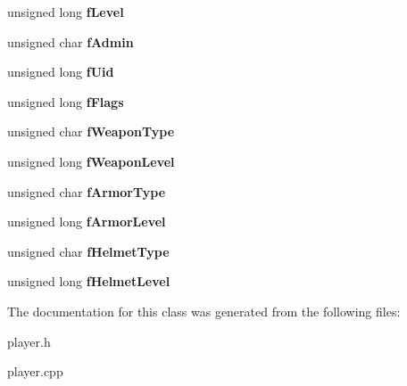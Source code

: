 \begin{DoxyCompactItemize}
\item 
\hypertarget{classplayer_aaa06e1028540c458c3f4f2fe6dcf1fa3}{unsigned long {\bfseries f\-Level}}\label{classplayer_aaa06e1028540c458c3f4f2fe6dcf1fa3}

\item 
\hypertarget{classplayer_a5241983acfa028407a099474e34e6abf}{unsigned char {\bfseries f\-Admin}}\label{classplayer_a5241983acfa028407a099474e34e6abf}

\item 
\hypertarget{classplayer_a9f8bf5485ace587327421f1baa667789}{unsigned long {\bfseries f\-Uid}}\label{classplayer_a9f8bf5485ace587327421f1baa667789}

\item 
\hypertarget{classplayer_acb3b632457f8051402696878577d49e0}{unsigned long {\bfseries f\-Flags}}\label{classplayer_acb3b632457f8051402696878577d49e0}

\item 
\hypertarget{classplayer_a374b721c5a66db6b7e9290a031094743}{unsigned char {\bfseries f\-Weapon\-Type}}\label{classplayer_a374b721c5a66db6b7e9290a031094743}

\item 
\hypertarget{classplayer_a23607d669aae25fc6f88081aded49383}{unsigned long {\bfseries f\-Weapon\-Level}}\label{classplayer_a23607d669aae25fc6f88081aded49383}

\item 
\hypertarget{classplayer_a56013e3d22640531c102419b8a845be0}{unsigned char {\bfseries f\-Armor\-Type}}\label{classplayer_a56013e3d22640531c102419b8a845be0}

\item 
\hypertarget{classplayer_a33fa80a6d4f45c9c80bc4bd490de13d1}{unsigned long {\bfseries f\-Armor\-Level}}\label{classplayer_a33fa80a6d4f45c9c80bc4bd490de13d1}

\item 
\hypertarget{classplayer_abc76c3d2c7d81e7bcf1dc8e41b4fca13}{unsigned char {\bfseries f\-Helmet\-Type}}\label{classplayer_abc76c3d2c7d81e7bcf1dc8e41b4fca13}

\item 
\hypertarget{classplayer_a0b378b51a70fc42ecfd3b9e5ba4d8d50}{unsigned long {\bfseries f\-Helmet\-Level}}\label{classplayer_a0b378b51a70fc42ecfd3b9e5ba4d8d50}

\end{DoxyCompactItemize}


\-The documentation for this class was generated from the following files\-:\begin{DoxyCompactItemize}
\item 
player.\-h\item 
player.\-cpp\end{DoxyCompactItemize}
